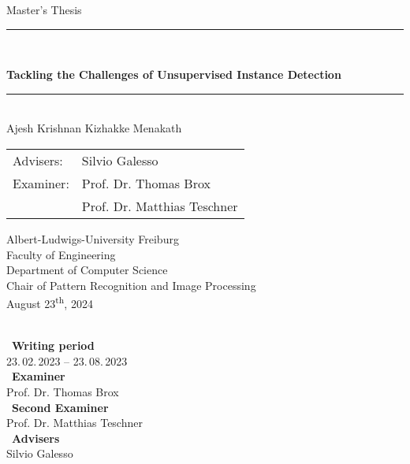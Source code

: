 
\begin{titlepage}
\begin{center}

\newcommand{\HorizontalLine}{\rule{\linewidth}{0.3mm}}

{\Large Master's Thesis}\\[1.3cm]


\HorizontalLine \\[0.4cm]
\begin{spacing}{2
}
    {\huge \bfseries Tackling the Challenges of Unsupervised Instance Detection} \\
\end{spacing}
\HorizontalLine \\[1.5cm]


{\Huge Ajesh Krishnan Kizhakke Menakath} \\[2cm]


\begin{tabular}[hc]{>{\huge}l >{\huge}l}
  
  Advisers: & Silvio Galesso \\[1.2cm]
  Examiner: & Prof. Dr. Thomas Brox \\[0.2cm]
    &          Prof. Dr. Matthias Teschner \\[0.3cm]
\end{tabular}
\vfill  %

\Large {
    Albert-Ludwigs-University Freiburg\\
    Faculty of Engineering\\
    Department of Computer Science\\
    Chair of Pattern Recognition and Image Processing\\[1cm]

    August 23\textsuperscript{th}, 2024\\
}
\end{center}
\end{titlepage}

\ \vfill \ \\  %
\
\textbf{Writing period}            \smallskip{} \\
23.\,02.\,2023 -- 23.\,08.\,2023   \bigskip{} \\
\
\textbf{Examiner}                  \smallskip{} \\
Prof. Dr. Thomas Brox              \bigskip{} \\
\
\textbf{Second Examiner}                  \smallskip{} \\
Prof. Dr. Matthias Teschner           \bigskip{} \\
\
\textbf{Advisers}                  \smallskip{} \\
Silvio Galesso

